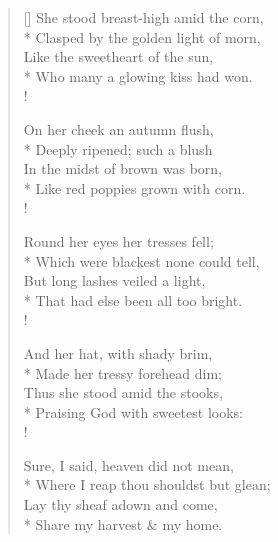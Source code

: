 \documentclass[MAIN]{subfiles}
\begin{document}
\settowidth{\versewidth}{She stood breast-high amid the corn,}
\begin{verse}[\versewidth]
She stood breast-high amid the corn,\\*
Clasped by the golden light of morn,\\
Like the sweetheart of the sun,\\*
Who many a glowing kiss had won.\\!

On her cheek an autumn flush,\\*
Deeply ripened; such a blush\\
In the midst of brown was born,\\*
Like red poppies grown with corn.\\!

Round her eyes her tresses fell;\\*
Which were blackest none could tell,\\
But long lashes veiled a light,\\*
That had else been all too bright.\\!

And her hat, with shady brim,\\*
Made her tressy forehead dim;\\
Thus she stood amid the stooks,\\*
Praising God with sweetest looks:\\!

Sure, I said, heaven did not mean,\\*
Where I reap thou shouldst but glean;\\
Lay thy sheaf adown and come,\\*
Share my harvest \& my home.
\end{verse}
\end{document}
